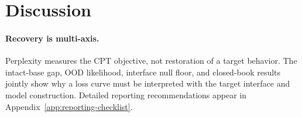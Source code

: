 \section{Discussion}
\label{sec:discussion}

\paragraph{Recovery is multi-axis.}
Perplexity measures the CPT objective, not restoration of a target behavior.
The intact-base gap, OOD likelihood, interface null floor, and closed-book
results jointly show why a loss curve must be interpreted with the target
interface and model construction. Detailed reporting recommendations appear in
Appendix~\ref{app:reporting-checklist}.
